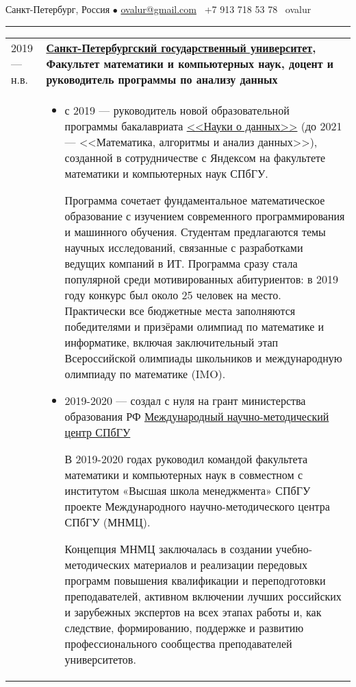 \documentclass[11pt]{article}
\newif\ifdetailed
\begin{document}
%

\vspace{0.5em}

\noindent Санкт-Петербург, Россия $\bullet$ \href{mailto:ovalur@gmail.com}{ovalur@gmail.com} \faMobile~+7 913 718 53 78 \faSendO~ovalur

\vspace{0.5em}
\hrule
\vspace{0.5em}

\begin{longtable} {l | p{}}
2019 — н.в. & {\textbf{\href{https://spbu.ru}{Санкт-Петербургский государственный университет}, Факультет математики и компьютерных наук, доцент и руководитель программы по анализу данных}} \\
\ifdetailed
&
\begin{itemize}
	\item с 2019 — руководитель новой образовательной программы бакалавриата \href{https://maad.compscicenter.ru}{<<Науки о данных>>} (до 2021 — <<Математика, алгоритмы и анализ данных>>), созданной в сотрудничестве с Яндексом на факультете математики и компьютерных наук СПбГУ.

	Программа сочетает фундаментальное математическое образование с изучением современного программирования и машинного обучения. Студентам предлагаются темы научных исследований, связанные с разработками ведущих компаний в ИТ. Программа сразу стала популярной среди мотивированных абитуриентов: в 2019 году конкурс был около 25 человек на место. Практически все бюджетные места заполняются победителями и призёрами олимпиад по математике и информатике, включая заключительный этап Всероссийской олимпиады школьников и международную олимпиаду по математике (IMO).

	\item 2019-2020 — создал с нуля на грант министерства образования РФ \href{https://gsom.spbu.ru/all_news/event2021-02-04/}{Международный научно-методический центр СПбГУ}

	В 2019-2020 годах руководил командой факультета математики и компьютерных наук в совместном с институтом «Высшая школа менеджмента» СПбГУ проекте Международного научно-методического центра СПбГУ (МНМЦ).

	Концепция МНМЦ заключалась в создании учебно-методических материалов и реализации передовых программ повышения квалификации и переподготовки преподавателей, активном включении лучших российских и зарубежных экспертов на всех этапах работы и, как следствие, формированию, поддержке и развитию профессионального сообщества преподавателей университетов.


\end{itemize}
\end{longtable}
\end{document}
